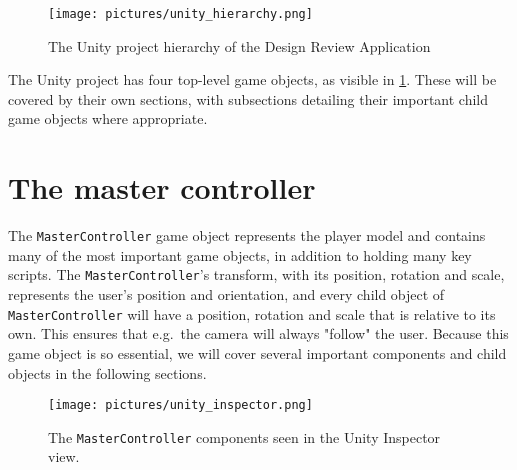 \begin{figure}%
	\texttt{[image: pictures/unity\_hierarchy.png]}
	\caption[The Unity project hierarchy of the Design Review Application]{The Unity project hierarchy of the Design Review Application}
	\label{fig:unity_hierarchy}
\end{figure} 

The Unity project has four top-level game objects, as visible in \ref{fig:unity_hierarchy}. 
These will be covered by their own sections, with subsections detailing their important child game objects where appropriate.


\section{The master controller}
The \texttt{MasterController} game object represents the player model and contains many of the most important game objects, in addition to
holding many key scripts. The \texttt{MasterController}'s transform, with its position, rotation and scale, represents the user's position and orientation, 
and every child object of \texttt{MasterController} will have a position, rotation and scale that is relative to its own. This ensures
that e.g.~the camera will always "follow" the user. Because this game object is so essential, we will cover several important components and
child objects in the following sections.

\begin{figure}%
	\texttt{[image: pictures/unity\_inspector.png]}
	\caption[The \texttt{MasterController} components]{The \texttt{MasterController} components seen in the Unity Inspector view.}
	\label{fig:unity_inspector}
\end{figure} 

